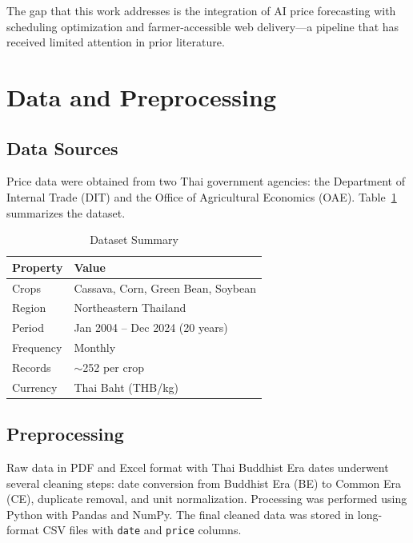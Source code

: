 \documentclass[conference]{IEEEtran}
\begin{document}
The gap that this work addresses is the integration of AI price forecasting with scheduling optimization and farmer-accessible web delivery---a pipeline that has received limited attention in prior literature.

\section{Data and Preprocessing}

\subsection{Data Sources}

Price data were obtained from two Thai government agencies: the Department of Internal Trade (DIT) and the Office of Agricultural Economics (OAE). Table~\ref{tab:dataset} summarizes the dataset.

\begin{table}[htbp]
  \centering
  \caption{Dataset Summary}
  \label{tab:dataset}
  \begin{tabular}{ll}
    \toprule
    \textbf{Property} & \textbf{Value} \\
    \midrule
    Crops & Cassava, Corn, Green Bean, Soybean \\
    Region & Northeastern Thailand \\
    Period & Jan 2004 -- Dec 2024 (20 years) \\
    Frequency & Monthly \\
    Records & $\sim$252 per crop \\
    Currency & Thai Baht (THB/kg) \\
    \bottomrule
  \end{tabular}
\end{table}

\subsection{Preprocessing}

Raw data in PDF and Excel format with Thai Buddhist Era dates underwent several cleaning steps: date conversion from Buddhist Era (BE) to Common Era (CE), duplicate removal, and unit normalization. Processing was performed using Python with Pandas and NumPy. The final cleaned data was stored in long-format CSV files with \texttt{date} and \texttt{price} columns.
\end{document}
